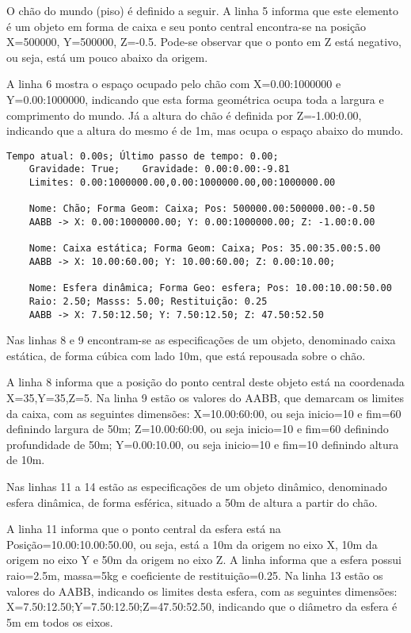 \documentclass[12pt]{article}
\begin{document}
O chão do mundo (piso) é definido a seguir. A linha 5 informa que este elemento é um objeto em forma de caixa e seu ponto central encontra-se na posição X=500000, Y=500000, Z=-0.5. Pode-se observar que o ponto em Z está negativo, ou seja, está um pouco abaixo da origem. 

A linha 6 mostra o espaço ocupado pelo chão com X=0.00:1000000 e Y=0.00:1000000, indicando que esta forma geométrica ocupa toda a largura e comprimento do mundo. Já a altura do chão é  definida por Z=-1.00:0.00, indicando que a altura do mesmo é de 1m, mas ocupa o espaço abaixo do mundo.

\begin{lstlisting}[frame=single,caption=Registro Acessível: Inicialização do ambiente\label{lg:init_world}]
	Tempo atual: 0.00s; Último passo de tempo: 0.00; 
	Gravidade: True; 	Gravidade: 0.00:0.00:-9.81
	Limites: 0.00:1000000.00,0.00:1000000.00,00:1000000.00

	Nome: Chão; Forma Geom: Caixa; Pos: 500000.00:500000.00:-0.50
	AABB -> X: 0.00:1000000.00; Y: 0.00:1000000.00; Z: -1.00:0.00
		
	Nome: Caixa estática; Forma Geom: Caixa; Pos: 35.00:35.00:5.00
	AABB -> X: 10.00:60.00; Y: 10.00:60.00; Z: 0.00:10.00; 
	
	Nome: Esfera dinâmica; Forma Geo: esfera; Pos: 10.00:10.00:50.00
	Raio: 2.50; Masss: 5.00; Restituição: 0.25
	AABB -> X: 7.50:12.50; Y: 7.50:12.50; Z: 47.50:52.50
\end{lstlisting}

Nas linhas 8 e 9 encontram-se as especificações de um objeto, denominado caixa estática, de forma cúbica com lado 10m, que está repousada sobre o chão.

A linha 8 informa que a posição do ponto central deste objeto está na coordenada X=35,Y=35,Z=5. Na linha 9 estão os valores do AABB, que demarcam os limites da caixa, com as seguintes dimensões: X=10.00:60:00, ou seja inicio=10 e fim=60 definindo largura de 50m; Z=10.00:60:00, ou seja inicio=10 e fim=60 definindo profundidade de 50m; Y=0.00:10.00, ou seja inicio=10 e fim=10 definindo altura de 10m.

Nas linhas 11 a 14 estão as especificações de um objeto dinâmico, denominado esfera dinâmica, de forma esférica, situado a 50m de altura a partir do chão. 

A linha 11 informa que o ponto central da esfera está na Posição=10.00:10.00:50.00, ou seja, está a 10m da origem no eixo X, 10m da origem no eixo Y e 50m da origem no eixo Z. A linha informa que a esfera possui raio=2.5m, massa=5kg e coeficiente de restituição=0.25. Na linha 13 estão os valores do AABB, indicando os limites desta esfera, com as seguintes dimensões: X=7.50:12.50;Y=7.50:12.50;Z=47.50:52.50, indicando que o diâmetro da esfera é 5m em todos os eixos.
\end{document}
